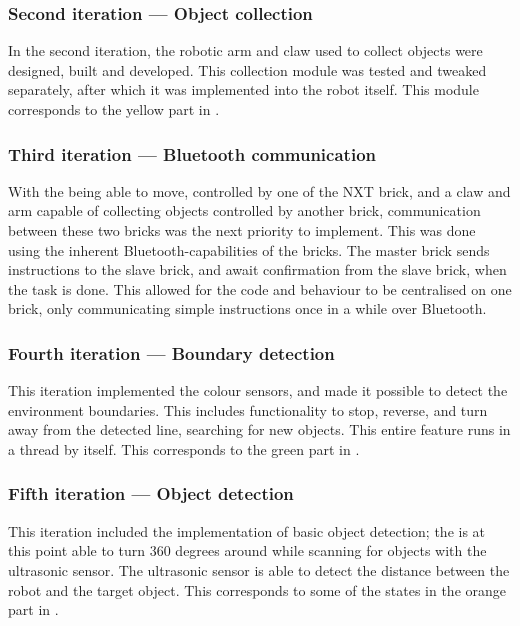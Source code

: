 \subsubsection{Second iteration --- Object collection}
In the second iteration, the robotic arm and claw used to collect objects were designed, built and developed. This collection module was tested and tweaked separately, after which it was implemented into the robot itself. This module corresponds to the yellow part in .


\subsubsection{Third iteration --- Bluetooth communication}
With the \projname{} being able to move, controlled by one of the NXT brick, and a claw and arm capable of collecting objects controlled by another brick, communication between these two bricks was the next priority to implement. This was done using the inherent Bluetooth-capabilities of the bricks. The master brick sends instructions to the slave brick, and await confirmation from the slave brick, when the task is done. This allowed for the code and behaviour to be centralised on one brick, only communicating simple instructions once in a while over Bluetooth.


\subsubsection{Fourth iteration --- Boundary detection}
This iteration implemented the colour sensors, and made it possible to detect the environment boundaries. This includes functionality to stop, reverse, and turn away from the detected line, searching for new objects. This entire feature runs in a thread by itself. This corresponds to the green part in . 


\subsubsection{Fifth iteration --- Object detection}
This iteration included the implementation of basic object detection; the \projname{} is at this point able to turn 360 degrees around while scanning for objects with the ultrasonic sensor. The ultrasonic sensor is able to detect the distance between the robot and the target object. This corresponds to some of the states in the orange part in .


